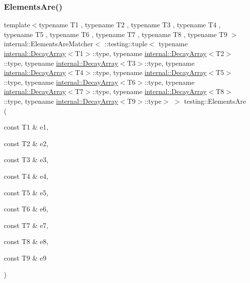 \subsubsection{\texorpdfstring{ElementsAre()}{ElementsAre()}\hspace{0.1cm}{\footnotesize\ttfamily [10/11]}}
{\footnotesize\ttfamily template$<$typename T1 , typename T2 , typename T3 , typename T4 , typename T5 , typename T6 , typename T7 , typename T8 , typename T9 $>$ \\
internal\+::\+Elements\+Are\+Matcher$<$ \+::testing\+::tuple$<$ typename \mbox{\hyperlink{structtesting_1_1internal_1_1DecayArray}{internal\+::\+Decay\+Array}}$<$T1$>$\+::type, typename \mbox{\hyperlink{structtesting_1_1internal_1_1DecayArray}{internal\+::\+Decay\+Array}}$<$T2$>$\+::type, typename \mbox{\hyperlink{structtesting_1_1internal_1_1DecayArray}{internal\+::\+Decay\+Array}}$<$T3$>$\+::type, typename \mbox{\hyperlink{structtesting_1_1internal_1_1DecayArray}{internal\+::\+Decay\+Array}}$<$T4$>$\+::type, typename \mbox{\hyperlink{structtesting_1_1internal_1_1DecayArray}{internal\+::\+Decay\+Array}}$<$T5$>$\+::type, typename \mbox{\hyperlink{structtesting_1_1internal_1_1DecayArray}{internal\+::\+Decay\+Array}}$<$T6$>$\+::type, typename \mbox{\hyperlink{structtesting_1_1internal_1_1DecayArray}{internal\+::\+Decay\+Array}}$<$T7$>$\+::type, typename \mbox{\hyperlink{structtesting_1_1internal_1_1DecayArray}{internal\+::\+Decay\+Array}}$<$T8$>$\+::type, typename \mbox{\hyperlink{structtesting_1_1internal_1_1DecayArray}{internal\+::\+Decay\+Array}}$<$T9$>$\+::type$>$ $>$ testing\+::\+Elements\+Are (\begin{DoxyParamCaption}\item[{const T1 \&}]{e1,  }\item[{const T2 \&}]{e2,  }\item[{const T3 \&}]{e3,  }\item[{const T4 \&}]{e4,  }\item[{const T5 \&}]{e5,  }\item[{const T6 \&}]{e6,  }\item[{const T7 \&}]{e7,  }\item[{const T8 \&}]{e8,  }\item[{const T9 \&}]{e9 }\end{DoxyParamCaption})\hspace{0.3cm}{\ttfamily [inline]}}

\mbox{\label{namespacetesting_a047f5f5a28c156a70002668323009ae9}} 
